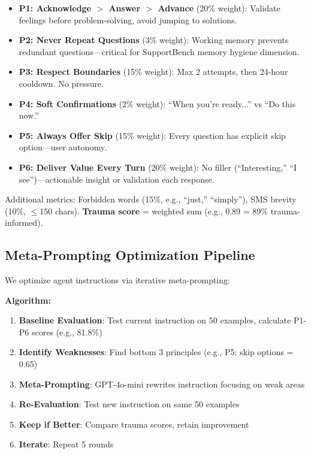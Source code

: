 \documentclass{article}
\begin{document}
\begin{itemize}
    \item \textbf{P1: Acknowledge $>$ Answer $>$ Advance} (20\% weight): Validate feelings before problem-solving, avoid jumping to solutions.
    \item \textbf{P2: Never Repeat Questions} (3\% weight): Working memory prevents redundant questions—critical for SupportBench memory hygiene dimension.
    \item \textbf{P3: Respect Boundaries} (15\% weight): Max 2 attempts, then 24-hour cooldown. No pressure.
    \item \textbf{P4: Soft Confirmations} (2\% weight): ``When you're ready...'' vs ``Do this now.''
    \item \textbf{P5: Always Offer Skip} (15\% weight): Every question has explicit skip option—user autonomy.
    \item \textbf{P6: Deliver Value Every Turn} (20\% weight): No filler (``Interesting,'' ``I see'')—actionable insight or validation each response.
\end{itemize}

Additional metrics: Forbidden words (15\%, e.g., ``just,'' ``simply''), SMS brevity (10\%, $\leq$150 chars). \textbf{Trauma score} = weighted sum (e.g., 0.89 = 89\% trauma-informed).

%
\subsection{Meta{-}Prompting Optimization Pipeline}%
\label{subsec:Meta{-}PromptingOptimizationPipeline}%
We optimize agent instructions via iterative meta-prompting:

\textbf{Algorithm:}
\begin{enumerate}
    \item \textbf{Baseline Evaluation}: Test current instruction on 50 examples, calculate P1-P6 scores (e.g., 81.8\%)
    \item \textbf{Identify Weaknesses}: Find bottom 3 principles (e.g., P5: skip options = 0.65)
    \item \textbf{Meta-Prompting}: GPT-4o-mini rewrites instruction focusing on weak areas
    \item \textbf{Re-Evaluation}: Test new instruction on same 50 examples
    \item \textbf{Keep if Better}: Compare trauma scores, retain improvement
    \item \textbf{Iterate}: Repeat 5 rounds
\end{enumerate}
\end{document}
